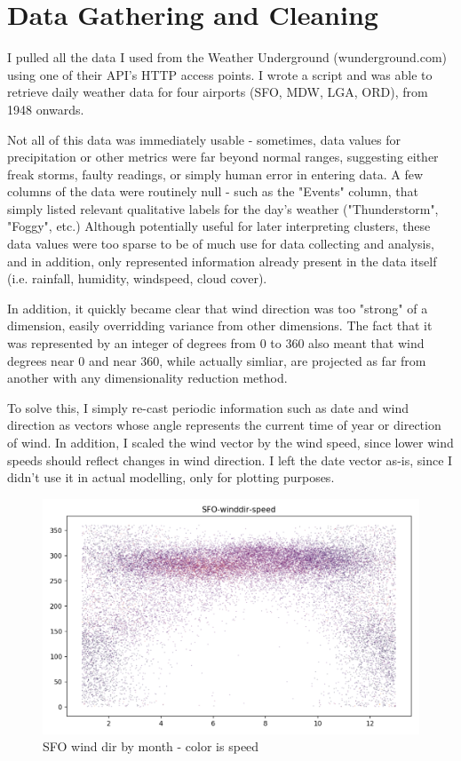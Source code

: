 \documentclass[a4paper]{article}
\begin{document}
\section{Data Gathering and Cleaning}

I pulled all the data I used from the Weather Underground (wunderground.com) using one of their API's HTTP access points. I wrote a script and was able to retrieve daily weather data for four airports (SFO, MDW, LGA, ORD), from 1948 onwards. 

Not all of this data was immediately usable - sometimes, data values for precipitation or other metrics were far beyond normal ranges, suggesting either freak storms, faulty readings, or simply human error in entering data. A few columns of the data were routinely null - such as the "Events" column, that simply listed relevant qualitative labels for the day's weather ("Thunderstorm", "Foggy", etc.) Although potentially useful for later interpreting clusters, these data values were too sparse to be of much use for data collecting and analysis, and in addition, only represented information already present in the data itself (i.e. rainfall, humidity, windspeed, cloud cover). 

In addition, it quickly became clear that wind direction was too "strong" of a dimension, easily overridding variance from other dimensions. The fact that it was represented by an integer of degrees from 0 to 360 also meant that wind degrees near 0 and near 360, while actually simliar, are projected as far from another with any dimensionality reduction method. 

To solve this, I simply re-cast periodic information such as date and wind direction as vectors whose angle represents the current time of year or direction of wind. In addition, I scaled the wind vector by the wind speed, since lower wind speeds should reflect changes in wind direction. I left the date vector as-is, since I didn't use it in actual modelling, only for plotting purposes.
 
\begin{figure}[t]
  \centering
  \includegraphics[width=\linewidth]{../png/basic-vis/SFO-winddir-speed.png}
  \caption{SFO wind dir by month - color is speed}
  \label{fig:SFO_dir_speed}
\end{figure}
\end{document}
